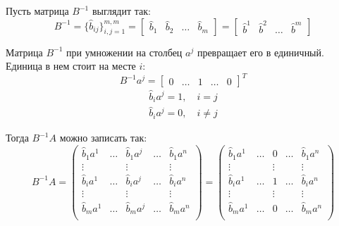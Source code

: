 \documentclass[a4paper,article,14pt]{extarticle}
\begin{document}
Пусть матрица \(B^{-1}\) выглядит так:
\begin{equation}
    B^{-1} =
    \{\hat b_{ij}\}_{i,j=1}^{m,m}
    =
    \begin{bmatrix}
        \hat b_1 &
        \hat b_2 &
        \ldots &
        \hat b_m
    \end{bmatrix}
    =
    \begin{bmatrix}
        \hat b^1 &
        \hat b^2 &
        \ldots &
        \hat b^m
    \end{bmatrix}
\end{equation}

Матрица \(B^{-1}\) при умножении на столбец \(a^j\) превращает его в единичный.
Единица в нем стоит на месте \(i\):
\begin{equation}
    B^{-1}a^j = \begin{bmatrix}
        0 & \ldots & 1 & \ldots & 0
    \end{bmatrix} ^T
\end{equation}
\begin{equation}
    \begin{gathered}
        \hat b_i a^j = 1, \quad i = j \\
        \hat b_i a^j = 0, \quad i \ne j
    \end{gathered}
\end{equation}

Тогда \(B^{-1}A\) можно записать так:
\begin{equation}
    B^{-1}A =
    \begin{pmatrix}
        \hat b_1a^1 & \ldots & \hat b_1a^j & \ldots & \hat b_1a^n \\
        \vdots & & \vdots & & \vdots \\
        \hat b_ia^1 & \ldots & \hat b_ia^j & \ldots & \hat b_ia^n \\
        \vdots & & \vdots & & \vdots \\
        \hat b_ma^1 & \ldots & \hat b_ma^j & \ldots & \hat b_ma^n \\
    \end{pmatrix}
    =
    \begin{pmatrix}
        \hat b_1a^1 & \ldots & 0 & \ldots & \hat b_1a^n \\
        \vdots & & \vdots & & \vdots \\
        \hat b_ia^1 & \ldots & 1 & \ldots & \hat b_ia^n \\
        \vdots & & \vdots & & \vdots \\
        \hat b_ma^1 & \ldots & 0 & \ldots & \hat b_ma^n \\
    \end{pmatrix}
\end{equation}
\end{document}
